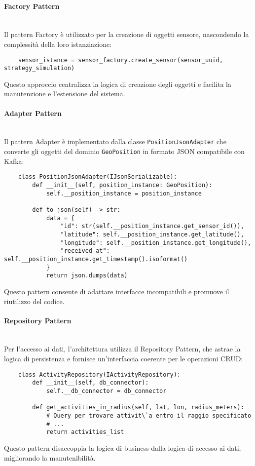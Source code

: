 \documentclass[10pt]{article}
\newcommand{\myparagraph}[1]{\paragraph{#1}\mbox{}\\}
\begin{document}
    \myparagraph{Factory Pattern}
    Il pattern Factory è utilizzato per la creazione di oggetti sensore, nascondendo la complessità della loro istanziazione:
    \begin{lstlisting}
    sensor_istance = sensor_factory.create_sensor(sensor_uuid, strategy_simulation)
    \end{lstlisting}
    Questo approccio centralizza la logica di creazione degli oggetti e facilita la manutenzione e l'estensione del sistema.

    \myparagraph{Adapter Pattern}
    Il pattern Adapter è implementato dalla classe \texttt{PositionJsonAdapter} che converte gli oggetti del dominio \texttt{GeoPosition} in formato JSON compatibile con Kafka:
    \begin{lstlisting}
    class PositionJsonAdapter(IJsonSerializable):
        def __init__(self, position_instance: GeoPosition):
            self.__position_instance = position_instance
            
        def to_json(self) -> str:
            data = {
                "id": str(self.__position_instance.get_sensor_id()),
                "latitude": self.__position_instance.get_latitude(),
                "longitude": self.__position_instance.get_longitude(),
                "received_at": self.__position_instance.get_timestamp().isoformat()
            }
            return json.dumps(data)
    \end{lstlisting}
    Questo pattern consente di adattare interfacce incompatibili e promuove il riutilizzo del codice.

    \myparagraph{Repository Pattern}
    Per l'accesso ai dati, l'architettura utilizza il Repository Pattern, che astrae la logica di persistenza e fornisce un'interfaccia coerente per le operazioni CRUD:
    \begin{lstlisting}
    class ActivityRepository(IActivityRepository):
        def __init__(self, db_connector):
            self.__db_connector = db_connector

        def get_activities_in_radius(self, lat, lon, radius_meters):
            # Query per trovare attivit\`a entro il raggio specificato
            # ...
            return activities_list
    \end{lstlisting}
    Questo pattern disaccoppia la logica di business dalla logica di accesso ai dati, migliorando la manutenibilità.
\end{document}
